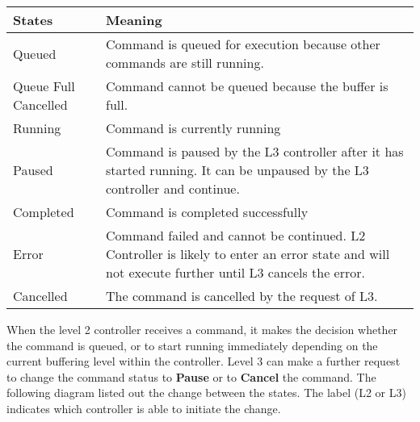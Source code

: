 \begin{table}[H]
\begin{adjustbox}{max width=\textwidth}
\begin{tabular}{p{2.7cm}p{13.02cm}}
\hline
\multicolumn{1}{|p{2.7cm}}{{\footnotesize \textbf{States}}} & 
\multicolumn{1}{|p{13.02cm}|}{{\footnotesize \textbf{Meaning}}} \\ 
\hline
\multicolumn{1}{|p{2.7cm}}{{\footnotesize Queued}} & 
\multicolumn{1}{|p{13.02cm}|}{{\footnotesize Command is queued for execution because other commands are still running. }} \\ 
\hline
\multicolumn{1}{|p{2.7cm}}{{\footnotesize Queue Full Cancelled}} & 
\multicolumn{1}{|p{13.02cm}|}{{\footnotesize Command cannot be queued because the buffer is full.}} \\ 
\hline
\multicolumn{1}{|p{2.7cm}}{{\footnotesize Running}} & 
\multicolumn{1}{|p{13.02cm}|}{{\footnotesize Command is currently running}} \\ 
\hline
\multicolumn{1}{|p{2.7cm}}{{\footnotesize Paused}} & 
\multicolumn{1}{|p{13.02cm}|}{{\footnotesize Command is paused by the L3 controller after it has started running. It can be unpaused by the L3 controller and continue.\par}} \\ 
\hline
\multicolumn{1}{|p{2.7cm}}{{\footnotesize Completed}} & 
\multicolumn{1}{|p{13.02cm}|}{{\footnotesize Command is completed successfully}} \\ 
\hline
\multicolumn{1}{|p{2.7cm}}{{\footnotesize Error}} & 
\multicolumn{1}{|p{13.02cm}|}{{\footnotesize Command failed and cannot be continued. L2 Controller is likely to enter an error state and will not execute further until L3 cancels the error.\par}} \\ 
\hline
\multicolumn{1}{|p{2.7cm}}{{\footnotesize Cancelled}} & 
\multicolumn{1}{|p{13.02cm}|}{{\footnotesize The command is cancelled by the request of L3.}} \\ 
\hline
\end{tabular}
\end{adjustbox}
\end{table}
When the level 2 controller receives a command, it makes the decision whether the command is queued, or to start running immediately depending on the current buffering level within the controller. Level 3 can make a further request to change the command status to \textbf{Pause }or to \textbf{Cancel }the command. The following diagram listed out the change between the states. The label (L2 or L3) indicates which controller is able to initiate the change. 


